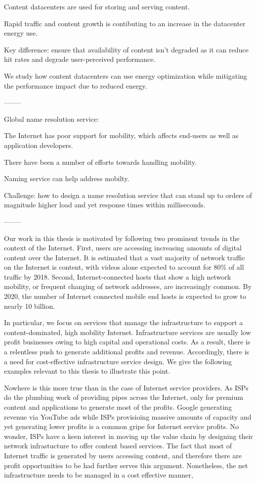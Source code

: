 Content datacenters are used for storing and serving content. 

Rapid traffic and content growth is contibuting to an increase in the datacenter energy use.

Key difference: ensure that availability of content isn't degraded as it can reduce hit rates and degrade user-perceived performance. 

We study how content datacenters can use energy optimization while mitigating the performance impact due to reduced energy.

--------

Global name resolution service:

The Internet has poor support for mobility, which affects end-users as well as application developers.

There have been a number of efforts towards handling mobility.

Naming service can help address mobilty.

Challenge: how to design a name resolution service that can stand up to orders of magnitude higher load and yet response times within milliseconds.

--------

Our work in this thesis is motivated by following two prominent trends in the context of the Internet. First, users are accessing increasing amounts of digital content over the Internet. It is estimated that a vast majority of network traffic on the Internet is content, with videos alone expected to account for 80\% of all traffic by 2018. Second, Internet-connected hosts that show a high network mobility, or frequent changing of network addresses, are increasingly common. By 2020, the number of Internet connected mobile end hosts is expected to grow to nearly 10 billion.

In particular, we focus on services that manage the infrastructure to support a content-dominated, high mobility Internet. Infrastructure services are usually low profit businesses owing to high capital and operational costs. As a result, there is a relentless push to generate additional profits and revenue. Accordingly, there is a need for cost-effective infrastructure service design. We give the following examples relevant to this thesis to illustrate this point. 

Nowhere is this more true than in the case of Internet service providers. As ISPs do the plumbing work of providing pipes across the Internet, only for premium content and applications to generate most of the profits. Google generating revenue via YouTube ads while ISPs provisioing massive amounts of capacity and yet generating lower profits is a common gripe for Internet service profits. No wonder, ISPs have a keen interest in moving up the value chain by designing their network infrastucture to offer content based services. The fact that most of Internet traffic is generated by users accessing content, and therefore there are profit opportunities to be had further serves this argument. Nonetheless, the net infrastructure needs to be managed in a cost effective manner, 

